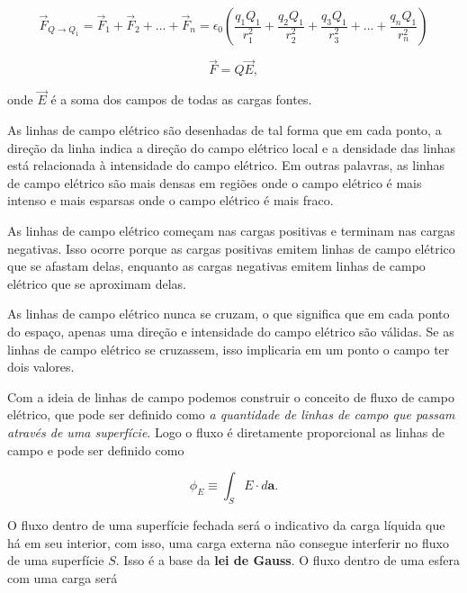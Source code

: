 \begin{equation*}
    \vec{F}_{Q \rightarrow Q_{1}} = \vec{F}_{1} + \vec{F}_{2} + ... + \vec{F}_{n} = \epsilon_{0}\left(\frac{q_{1}Q_{1}}{r_{1}^2} + \frac{q_{2}Q_{1}}{r_{2}^2} + \frac{q_{3}Q_{1}}{r_{3}^2} + ... + \frac{q_{n}Q_{1}}{r_{n}^2}\right) 
\end{equation*}

\begin{equation}
    \vec{F} = Q\Vec{E},
\end{equation}

onde $\vec{E}$ é a soma dos campos de todas as cargas fontes.



As linhas de campo elétrico são desenhadas de tal forma que em cada ponto, a direção da linha indica a direção do campo elétrico local e a densidade das linhas está relacionada à intensidade do campo elétrico. Em outras palavras, as linhas de campo elétrico são mais densas em regiões onde o campo elétrico é mais intenso e mais esparsas onde o campo elétrico é mais fraco.

As linhas de campo elétrico começam nas cargas positivas e terminam nas cargas negativas. Isso ocorre porque as cargas positivas emitem linhas de campo elétrico que se afastam delas, enquanto as cargas negativas emitem linhas de campo elétrico que se aproximam delas.

As linhas de campo elétrico nunca se cruzam, o que significa que em cada ponto do espaço, apenas uma direção e intensidade do campo elétrico são válidas. Se as linhas de campo elétrico se cruzassem, isso implicaria em um ponto o campo ter dois valores.

Com a ideia de linhas de campo podemos construir o conceito de fluxo de campo elétrico, que pode ser definido como \textit{a quantidade de linhas de campo que passam através de uma superfície}. Logo o fluxo é diretamente proporcional as linhas de campo e pode ser definido como

\[\phi_{E} \equiv \int_{S} E \cdot d\textbf{a} .\] 

O fluxo dentro de uma superfície fechada será o indicativo da carga líquida que há em seu interior, com isso, uma carga externa não consegue interferir no fluxo de uma superfície $S$. Isso é a base da \textbf{lei de Gauss}.  O fluxo dentro de uma esfera com uma carga será


